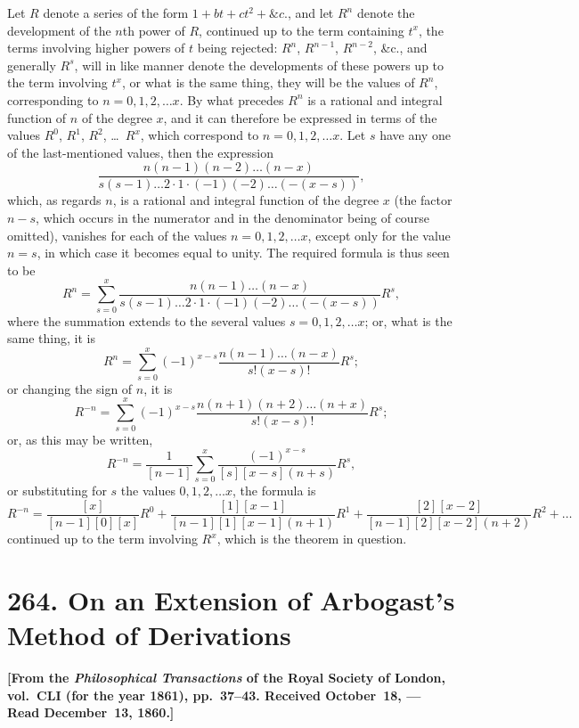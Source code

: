 \documentclass[11pt,a4paper]{article}
\theoremstyle{definition}
\begin{document}
Let $R$ denote a series of the form $1+bt+ct^2+\&c.$, and let $R^n$ denote the development of the $n$th power of $R$, continued up to the term containing $t^x$, the terms involving higher powers of $t$ being rejected: $R^n$, $R^{n-1}$, $R^{n-2}$, \&c., and generally $R^s$, will in like manner denote the developments of these powers up to the term involving $t^x$, or what is the same thing, they will be the values of $R^n$, corresponding to $n=0,1,2,\ldots x$. By what precedes $R^n$ is a rational and integral function of $n$ of the degree $x$, and it can therefore be expressed in terms of the values $R^0$, $R^1$, $R^2$, \ldots\ $R^x$, which correspond to $n=0,1,2,\ldots x$. Let $s$ have any one of the last-mentioned values, then the expression
\[
\frac{n(n-1)(n-2)\ldots(n-x)}{s(s-1)\ldots2\cdot1\cdot(-1)(-2)\ldots(-(x-s))},
\]
which, as regards $n$, is a rational and integral function of the degree $x$ (the factor $n-s$, which occurs in the numerator and in the denominator being of course omitted), vanishes for each of the values $n=0,1,2,\ldots x$, except only for the value $n=s$, in which case it becomes equal to unity. The required formula is thus seen to be
\[
R^n=\sum_{s=0}^{x} \frac{n(n-1)\ldots(n-x)}{s(s-1)\ldots2\cdot1\cdot(-1)(-2)\ldots(-(x-s))}R^s,
\]
where the summation extends to the several values $s=0,1,2,\ldots x$; or, what is the same thing, it is
\[
R^n=\sum_{s=0}^{x} (-1)^{x-s}\frac{n(n-1)\ldots(n-x)}{s!(x-s)!}R^s;
\]
or changing the sign of $n$, it is
\[
R^{-n}=\sum_{s=0}^{x} (-1)^{x-s}\frac{n(n+1)(n+2)\ldots(n+x)}{s!(x-s)!}R^s;
\]
or, as this may be written,
\[
R^{-n}=\frac{1}{[n-1]}\sum_{s=0}^{x}\frac{(-1)^{x-s}}{[s][x-s](n+s)}R^s,
\]
or substituting for $s$ the values $0,1,2,\ldots x$, the formula is
\[
R^{-n}=\frac{[x]}{[n-1][0][x]}R^0+\frac{[1][x-1]}{[n-1][1][x-1](n+1)}R^1+\frac{[2][x-2]}{[n-1][2][x-2](n+2)}R^2+\ldots
\]
continued up to the term involving $R^x$, which is the theorem in question.

\newpage
\section[264. Extension of Arbogast's Method]{264. On an Extension of Arbogast's Method of Derivations}

\textbf{[From the \textit{Philosophical Transactions} of the Royal Society of London, vol.~CLI (for the year 1861), pp.~37--43. Received October~18, --- Read December~13, 1860.]}
\end{document}

